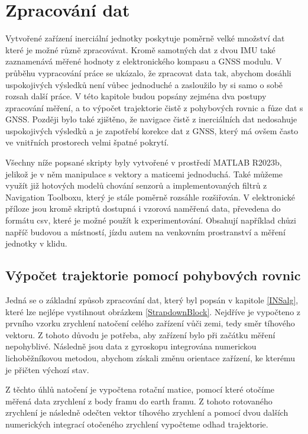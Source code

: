 \chapter{Zpracování dat}
Vytvořené zařízení inerciální jednotky poskytuje poměrně velké množství dat které je možné různě zpracovávat. Kromě samotných dat z dvou IMU také zaznamenává měřené hodnoty z elektronického kompasu a GNSS modulu. V průběhu vypracování práce se ukázalo, že zpracovat data tak, abychom dosáhli uspokojivých výsledků není vůbec jednoduché a zasloužilo by si samo o sobě rozsah další práce. V této kapitole budou popsány zejména dva postupy zpracování měření, a to výpočet trajektorie čistě z pohybových rovnic a fůze dat s GNSS. Později bylo také zjištěno, že navigace čistě z inerciálních dat nedosahuje uspokojivých výsledků a je zapotřebí korekce dat z GNSS, který má ovšem často ve vnitřních prostorech velmi špatné pokrytí.

Všechny níže popsané skripty byly vytvořené v prostředí MATLAB R2023b, jelikož je v něm manipulace s vektory a maticemi jednoduchá. Také můžeme využít již hotových modelů chování senzorů a implementovaných filtrů z Navigation Toolboxu, který je stále poměrně rozsáhle rozšiřován. V elektronické příloze jsou kromě skriptů dostupná i vzorová naměřená data, převedena do formátu csv, které je možné použít k experimentování. Obsahují například chůzi napříč budovou a místností, jízdu autem na venkovním prostranství a měření jednotky v klidu.

\section{Výpočet trajektorie pomocí pohybových rovnic} \label{noFiltProcessing}
Jedná se o základní způsob zpracování dat, který byl popsán v kapitole \ref{INSalg}, které lze nejlépe vystihnout obrázkem  \ref{StrapdownBlock}. Nejdříve je vypočteno z prvního vzorku zrychlení natočení celého zařízení vůči zemi, tedy směr tíhového vektoru. Z tohoto důvodu je potřeba, aby zařízení bylo při začátku měření nepohyblivé. Následně jsou data z gyroskopu integrována numerickou lichoběžníkovou metodou, abychom získali změnu orientace zařízení, ke kterému je přičten výchozí stav.

Z těchto úhlů natočení je vypočtena rotační matice, pomocí které otočíme měřená data zrychlení z body framu do earth framu. Z tohoto rotovaného zrychlení je následně odečten vektor tíhového zrychlení a pomocí dvou dalších numerických integrací otočeného zrychlení vypočteme odhad trajektorie.

